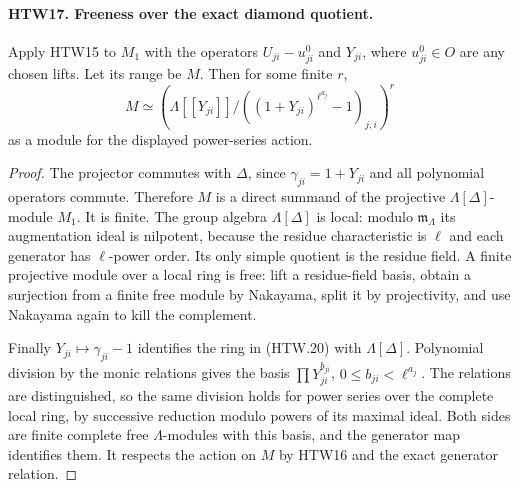 \paragraph{HTW17. Freeness over the exact diamond quotient.}
\label{claim:HTW17}
Apply HTW15 to \(M_1\) with the operators
\(U_{ji}-u^0_{ji}\) and \(Y_{ji}\), where \(u^0_{ji}\in O\)
are any chosen lifts.  Let its range be \(M\).
Then for some finite \(r\),
\[
 M\simeq\left(
  \Lambda[[Y_{ji}]]/
       ((1+Y_{ji})^{\ell^{a_j}}-1)_{j,i}
                   \right)^r
 \tag{HTW.20}
\]
as a module for the displayed power-series action.
\begin{proof}
The projector commutes with \(\Delta\), since
\(\gamma_{ji}=1+Y_{ji}\) and all polynomial operators
commute.  Therefore \(M\) is a direct summand of
the projective \(\Lambda[\Delta]\)-module \(M_1\).
It is finite.  The group algebra \(\Lambda[\Delta]\)
is local: modulo \(\mathfrak m_\Lambda\) its augmentation
ideal is nilpotent, because the residue characteristic
is \(\ell\) and each generator has \(\ell\)-power order.
Its only simple quotient is the residue field.
A finite projective module over a local ring is free:
lift a residue-field basis, obtain a surjection from
a finite free module by Nakayama, split it by
projectivity, and use Nakayama again to kill the
complement.

Finally \(Y_{ji}\mapsto\gamma_{ji}-1\) identifies
the ring in (HTW.20) with \(\Lambda[\Delta]\).
Polynomial division by the monic relations gives
the basis \(\prod Y_{ji}^{b_{ji}}\), \(0\le b_{ji}<\ell^{a_j}\).
The relations are distinguished, so the same division
holds for power series over the complete local ring,
by successive reduction modulo powers of its maximal
ideal.  Both sides are finite complete free
\(\Lambda\)-modules with this basis, and the generator
map identifies them.  It respects the action on \(M\)
by HTW16 and the exact generator relation.
\end{proof}

